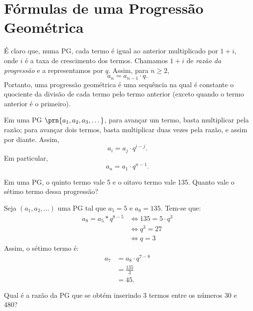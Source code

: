 \section{Fórmulas de uma Progressão Geométrica}

\begin{remark}
É claro que, numa PG, cada termo é igual ao anterior multiplicado por $1 + i$, onde $i$ é a taxa de crescimento dos termos. Chamamos $1+i$ de \emph{razão da progressão} e a representamos por $q$. Assim, para $n \ge 2$,
%
\begin{equation*}
a_n = a_{n-1} \cdot q.
\end{equation*}
%
\noindent Portanto, uma progressão geométrica é uma sequência na qual é constante o quociente da divisão de cada termo pelo termo anterior (exceto quando o termo anterior é o primeiro). 

Em uma PG $\prn{a_1, a_2, a_3 , \dots}$, para avançar um termo, basta multiplicar pela razão; para avançar dois termos, basta multiplicar duas vezes pela razão, e assim por diante. Assim, 
%
\begin{equation*}
a_i = a_j \cdot q^{i-j}.
\end{equation*}
%
Em particular,
%
\begin{equation*}
a_n = a_1\cdot q^{n-1}.
\end{equation*}
\end{remark}

\begin{example}
Em uma PG, o quinto termo vale 5 e o oitavo termo vale 135. Quanto vale o sétimo termo dessa progressão?
\end{example}

\begin{solution}
Seja $(a_1, a_2, \dots)$ uma PG tal que $a_5 =5$ e $a_8=135$. Tem-se que:
%
\begin{align*}
a_8 = a_5 * q^{8-5} & \iff 135 = 5 \cdot q ^3 \\ & \iff q^3 = 27 \\ & \iff q = 3
\end{align*}
%
Assim, o sétimo termo é:
%
\begin{align*}
a_7 & = a_8 \cdot q ^{7-8} \\ &= \frac {135} 3 \\ &= 45.
\end{align*}
\end{solution}

\begin{example}
Qual é a razão da PG que se obtém inserindo 3 termos entre os números 30 e 480?
\end{example}

